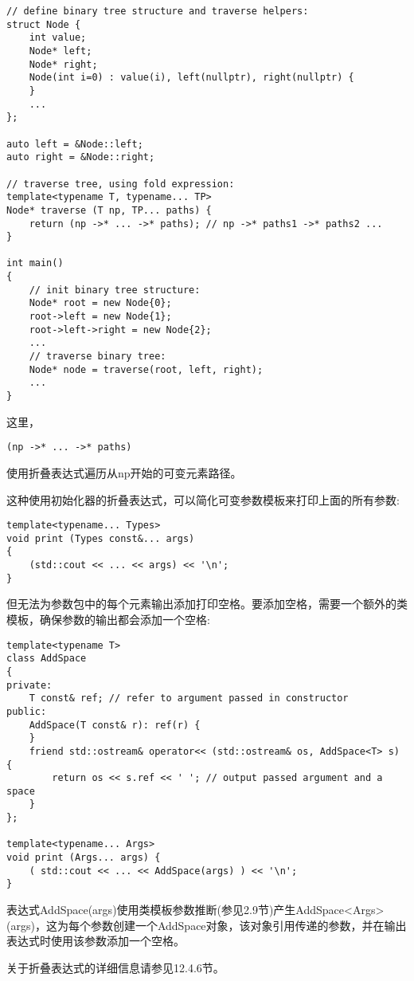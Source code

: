 \begin{lstlisting}[style=styleCXX]
// define binary tree structure and traverse helpers:
struct Node {
	int value;
	Node* left;
	Node* right;
	Node(int i=0) : value(i), left(nullptr), right(nullptr) {
	}
	...
};

auto left = &Node::left;
auto right = &Node::right;

// traverse tree, using fold expression:
template<typename T, typename... TP>
Node* traverse (T np, TP... paths) {
	return (np ->* ... ->* paths); // np ->* paths1 ->* paths2 ...
}

int main()
{
	// init binary tree structure:
	Node* root = new Node{0};
	root->left = new Node{1};
	root->left->right = new Node{2};
	...
	// traverse binary tree:
	Node* node = traverse(root, left, right);
	...
}
\end{lstlisting}

这里，

\begin{lstlisting}[style=styleCXX]
(np ->* ... ->* paths)
\end{lstlisting}

使用折叠表达式遍历从np开始的可变元素路径。

这种使用初始化器的折叠表达式，可以简化可变参数模板来打印上面的所有参数:

\begin{lstlisting}[style=styleCXX]
template<typename... Types>
void print (Types const&... args)
{
	(std::cout << ... << args) << '\n';
}
\end{lstlisting}

但无法为参数包中的每个元素输出添加打印空格。要添加空格，需要一个额外的类模板，确保参数的输出都会添加一个空格:

\begin{lstlisting}[style=styleCXX]
template<typename T>
class AddSpace
{
private:
	T const& ref; // refer to argument passed in constructor
public:
	AddSpace(T const& r): ref(r) {
	}
	friend std::ostream& operator<< (std::ostream& os, AddSpace<T> s) {
		return os << s.ref << ' '; // output passed argument and a space
	}
};

template<typename... Args>
void print (Args... args) {
	( std::cout << ... << AddSpace(args) ) << '\n';
}
\end{lstlisting}

表达式AddSpace(args)使用类模板参数推断(参见2.9节)产生AddSpace<Args>(args)，这为每个参数创建一个AddSpace对象，该对象引用传递的参数，并在输出表达式时使用该参数添加一个空格。

关于折叠表达式的详细信息请参见12.4.6节。
































